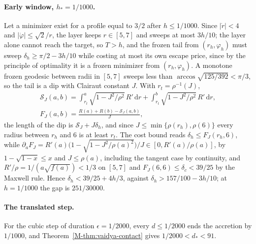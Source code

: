 \documentclass[aip,jmp,amsmath,amssymb,reprint]{revtex4-2}
\newcommand{\dd}{\mathrm{d}}
\theoremstyle{plain}
\theoremstyle{definition}
\begin{document}
\paragraph{Early window, $h_*=1/1000$.} Let a minimizer exist for a profile equal to $3/2$ after $h\le1/1000$.
Since $|\dot r|<4$ and $|\dot\varphi|\le\sqrt2/r$, the layer keeps $r\in[5,7]$ and sweeps at most $3h/10$; the layer alone
cannot reach the target, so $T>h$, and the frozen tail from $(r_h,\varphi_h)$ must sweep $\delta_h\ge\pi/2-3h/10$ while costing at most its own escape price, since by the principle of optimality it is a frozen minimizer from
$(r_h,\varphi_h)$. A
monotone frozen geodesic between radii in $[5,7]$ sweeps less than $\arccos\sqrt{125/392}<\pi/3$, so the tail is
a dip with Clairaut constant $J$. With $r_t=\rho^{-1}(J)$,
\begin{gather*}
  \mathcal S_J(a,b)=\int_{r_t}^{a}\sqrt{1-J^2/\rho^2}\,R'\,\dd r+\int_{r_t}^{b}\sqrt{1-J^2/\rho^2}\,R'\,\dd r,\\
  F_J(a,b)=\frac{R(a)+R(b)-\mathcal S_J(a,b)}J,
\end{gather*}
the length of the dip is $\mathcal S_J+J\delta_h$, and since $J\le\min\{\rho(r_h),\rho(6)\}$ every radius between $r_h$ and $6$
is at least $r_t$. The cost bound reads
$\delta_h\le F_J(r_h,6)$, while $\partial_aF_J=R'(a)\bigl(1-\sqrt{1-J^2/\rho(a)^2}\bigr)/J\in[0,R'(a)/\rho(a)]$, by $1-\sqrt{1-x}\le x$ and
$J\le\rho(a)$, including the tangent case by continuity, and $R'/\rho=1/(a\sqrt{f(a)})<1/3$ on $[5,7]$ and $F_J(6,6)\le\delta_c<39/25$ by the
Maxwell rule. Hence $\delta_h<39/25+4h/3$, against $\delta_h>157/100-3h/10$; at $h=1/1000$ the gap is $251/30000$.

\paragraph{The translated step.} For the cubic step of duration $\epsilon=1/2000$, every $d\le1/2000$ ends the
accretion by $1/1000$, and Theorem~\ref{M-thm:vaidya-contact} gives $1/2000<d_*<91$.
\end{document}
